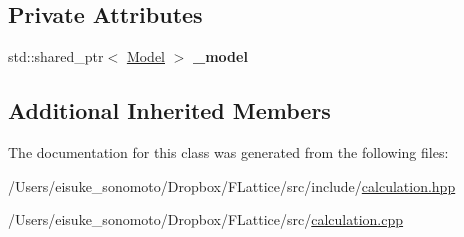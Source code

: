 \subsection*{Private Attributes}
\begin{DoxyCompactItemize}
\item 
\mbox{\label{class_calculate_energy_adb103d2c892ae25df1d14af57f0a2143}} 
std\+::shared\+\_\+ptr$<$ \mbox{\hyperlink{class_model}{Model}} $>$ {\bfseries \+\_\+model}
\end{DoxyCompactItemize}
\subsection*{Additional Inherited Members}


The documentation for this class was generated from the following files\+:\begin{DoxyCompactItemize}
\item 
/\+Users/eisuke\+\_\+sonomoto/\+Dropbox/\+F\+Lattice/src/include/\mbox{\hyperlink{calculation_8hpp}{calculation.\+hpp}}\item 
/\+Users/eisuke\+\_\+sonomoto/\+Dropbox/\+F\+Lattice/src/\mbox{\hyperlink{calculation_8cpp}{calculation.\+cpp}}\end{DoxyCompactItemize}
